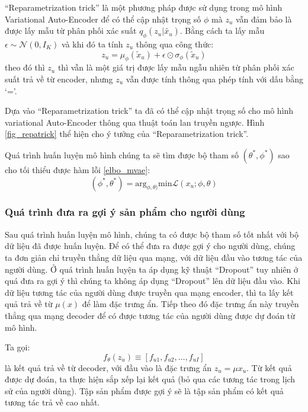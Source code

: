     ``Reparametrization trick'' là một phương pháp được sử dụng trong mô hình Variational Auto-Encoder để có thể cập nhật trọng số $\phi$ mà $z_u$ vẫn đảm bảo là được lấy mẫu từ phân phối xác suất $q_\phi(z_u|\tilde{x_u})$. 
    Bằng cách ta lấy mẫu $\epsilon \sim \mathcal{N}(0,I_K)$ và khi đó ta tính $z_u$ thông qua công thức:
    \begin{equation}
        z_u = \mu_\phi(\tilde{x}_u) + \epsilon \odot \sigma_\phi(\tilde{x}_u)
    \end{equation}
    theo đó thì $z_u$ thì vẫn là một giá trị được lấy mẫu ngẫu nhiên từ phân phối xác suất trả về từ encoder, nhưng $z_u$ vẫn được tính thông qua phép tính với dấu bằng `='.
    
    Dựa vào ``Reparametrization trick'' ta đã có thể cập nhật trọng số cho mô hình variational Auto-Encoder thông qua thuật toán lan truyền ngược. 
    Hình \ref{fig_repatrick} thể hiện cho ý tưởng của ``Reparametrization trick''.

    Quá trình huấn luyện mô hình chúng ta sẽ tìm được bộ tham số $(\theta^*, \phi^*)$ sao cho tối thiểu được hàm lỗi \ref{elbo_mvae}:
    \begin{equation}
        \label{vae_w}
        (\phi^*,\theta^*) = \text{arg}_{\phi,\theta)} \text{min} \mathcal{L}(x_u;\phi,\theta)
    \end{equation}

    \subsubsection{Quá trình đưa ra gợi ý sản phẩm cho người dùng}
    Sau quá trình huấn luyện mô hình, chúng ta có được bộ tham số tốt nhất với bộ dữ liệu đã được huấn luyện.
    Để có thể đưa ra được gợi ý cho người dùng, chúng ta đơn giản chỉ truyền thẳng dữ liệu qua mạng, với dữ liệu đầu vào tương tác của người dùng.
    Ở quá trình huấn luyện ta áp dụng kỹ thuật ``Dropout'' tuy nhiên ở quá đưa ra gợi ý thì chúng ta không áp dụng ``Dropout'' lên dữ liệu đầu vào. 
    Khi dữ liệu tương tác của người dùng được truyền qua mạng encoder, thì ta lấy kết quả trả về từ $\mu(x)$ để làm đặc trưng ẩn.
    Tiếp theo đó đặc trưng ẩn này truyền thẳng qua mạng decoder để có được tương tác của người dùng được dự đoán từ mô hình.
    
    Ta gọi: 
    \begin{equation}
        f_\theta(z_u) \equiv [f_{u1}, f_{u2}, \dots , f_{uI}]
    \end{equation}
    là kết quả trả về từ decoder, với đầu vào là đặc trưng ẩn $z_u = \mu{x_u}$.
    Từ kết quả được dự đoán, ta thực hiện sắp xếp lại kết quả (bỏ qua các tương tác trong lịch sử của người dùng).
    Tập sản phẩm được gợi ý sẽ là tập sản phẩm có kết quả tương tác trả về cao nhất. 

